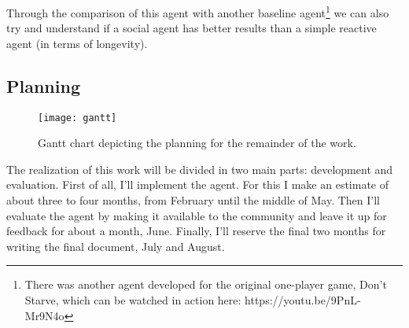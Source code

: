 Through the comparison of this agent with another baseline agent\footnote{There was another agent developed for the original one-player game, Don't Starve, which can be watched in action here: https://youtu.be/9PnL-Mr9N4o} we can also try and understand if a social agent has better results than a simple reactive agent (in terms of longevity).

\subsection{Planning}
\begin{figure}
  \centering
    \texttt{[image: gantt]}
  \caption{Gantt chart depicting the planning for the remainder of the work.}
  \label{fig:gantt}
\end{figure}
The realization of this work will be divided in two main parts: development and evaluation.
First of all, I'll implement the agent.
For this I make an estimate of about three to four months, from February until the middle of May.
Then I'll evaluate the agent by making it available to the community and leave it up for feedback for about a month, June.
Finally, I'll reserve the final two months for writing the final document, July and August.


